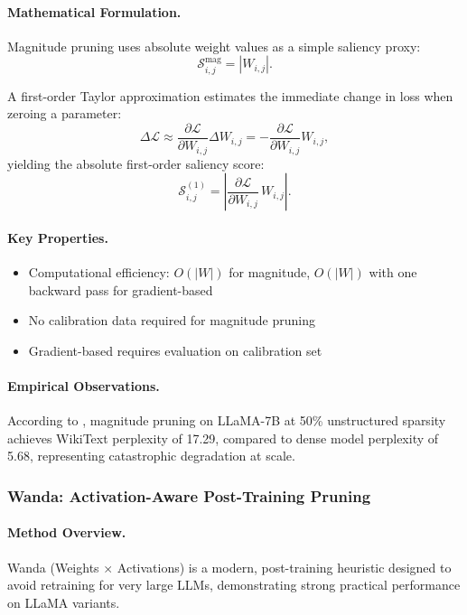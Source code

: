 \paragraph{Mathematical Formulation.}
Magnitude pruning uses absolute weight values as a simple saliency proxy:
\begin{equation}
	\mathcal{S}^{\mathrm{mag}}_{i,j} = |W_{i,j}|.
\end{equation}

A first-order Taylor approximation estimates the immediate change in loss when zeroing a parameter:
\begin{equation}
	\Delta\mathcal{L} \approx \frac{\partial\mathcal{L}}{\partial W_{i,j}} \Delta W_{i,j}
	= -\frac{\partial\mathcal{L}}{\partial W_{i,j}} W_{i,j},
\end{equation}
yielding the absolute first-order saliency score:
\begin{equation}
	\mathcal{S}^{(1)}_{i,j} = \left|\frac{\partial\mathcal{L}}{\partial W_{i,j}}\,W_{i,j}\right|.
	\label{eq:first-order-saliency}
\end{equation}

\paragraph{Key Properties.}
\begin{itemize}[nosep]
	\item Computational efficiency: $O(|W|)$ for magnitude, $O(|W|)$ with one backward pass for gradient-based
	\item No calibration data required for magnitude pruning
	\item Gradient-based requires evaluation on calibration set
\end{itemize}

\paragraph{Empirical Observations.} According to \cite{sun2023simple}, magnitude pruning on LLaMA-7B at 50\% unstructured sparsity achieves WikiText perplexity of 17.29, compared to dense model perplexity of 5.68, representing catastrophic degradation at scale.

\subsubsection{Wanda: Activation-Aware Post-Training Pruning}

\paragraph{Method Overview.} Wanda (Weights $\times$ Activations) \cite{sun2023simple} is a modern, post-training heuristic designed to avoid retraining for very large LLMs, demonstrating strong practical performance on LLaMA variants.

